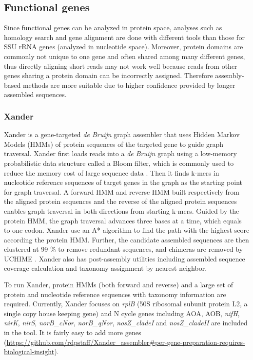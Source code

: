 \documentclass[]{msu-thesis}
\begin{document}
\subsection{Functional genes}
Since functional genes can be analyzed in
protein space, analyses such as homology search and gene alignment are
done with different tools than those for SSU rRNA genes (analyzed in
nucleotide space). Moreover, protein domains are commonly not unique to
one gene and often shared among many different genes, thus directly
aligning short reads may not work well because reads from other genes
sharing a protein domain can be incorrectly assigned. Therefore assembly-based
methods are more suitable due to higher confidence provided by longer
assembled sequences.

\subsubsection{Xander}
Xander \cite{wang_xander:_2015} is a gene-targeted \textit{de Bruijn} graph assembler that uses
Hidden Markov Models (HMMs) of protein sequences of the targeted gene to
guide graph traversal.  Xander first loads reads into a \textit{de
Bruijn} graph using a low-memory probabilistic data structure called a
Bloom filter, which is commonly used to reduce the memory cost of large
sequence data \cite{pell_scaling_2012}. Then it finds k-mers in
nucleotide reference sequences of target genes in the graph as the
starting point for graph traversal. A forward HMM and reverse HMM built
respectively from the aligned protein sequences and the reverse of the
aligned protein sequences enables graph traversal in both directions
from starting k-mers. Guided by the protein HMM, the graph traversal
advances three bases at a time, which equals to one codon. Xander use an
A* algorithm to find the path with the highest score according the
protein HMM. Further, the candidate assembled sequences are then
clustered at 99 \% to remove redundant sequences, and chimeras are
removed by UCHIME \cite{edgar_uchime_2011}. Xander also has
post-assembly utilities including assembled sequence coverage
calculation and taxonomy assignment by nearest neighbor.

To run Xander, protein HMMs (both forward and reverse) and a large set
of protein and nucleotide reference sequences with taxonomy information
are required. Currently, Xander focuses on \textit{rplB} (50S ribosomal subunit
protein L2, a single copy house
keeping gene) and N cycle genes including AOA, AOB, \textit{nifH},
\textit{nirK}, \textit{nirS}, \textit{norB\_cNor}, \textit{norB\_qNor},
\textit{nosZ\_cladeI} and \textit{nosZ\_cladeII} are included in the
tool. It is fairly easy to add more genes
(\url{https://github.com/rdpstaff/Xander\_assembler\#per-gene-preparation-requires-biological-insight}).
\end{document}
